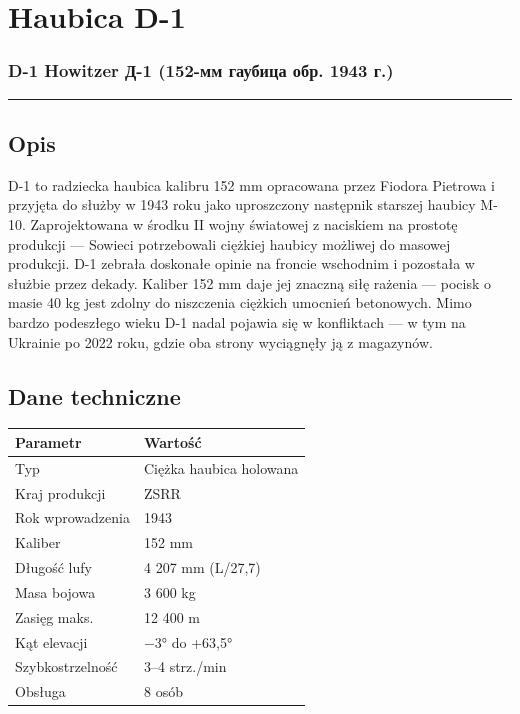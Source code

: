 \documentclass[12pt,openany,oneside]{book}
\begin{document}
\chapter{Haubica D-1}\label{haubica-d-1}

\subsection{D-1 Howitzer \textbar{} Д-1 (152-мм гаубица обр. 1943
г.)}\label{d-1-howitzer-ux434-1-152-ux43cux43c-ux433ux430ux443ux431ux438ux446ux430-ux43eux431ux440.-1943-ux433.}

\begin{center}\rule{0.5\linewidth}{0.5pt}\end{center}

\section{Opis}\label{opis-19}

D-1 to radziecka haubica kalibru 152 mm opracowana przez Fiodora
Pietrowa i przyjęta do służby w 1943 roku jako uproszczony następnik
starszej haubicy M-10. Zaprojektowana w środku II wojny światowej z
naciskiem na prostotę produkcji --- Sowieci potrzebowali ciężkiej
haubicy możliwej do masowej produkcji. D-1 zebrała doskonałe opinie na
froncie wschodnim i pozostała w służbie przez dekady. Kaliber 152 mm
daje jej znaczną siłę rażenia --- pocisk o masie 40 kg jest zdolny do
niszczenia ciężkich umocnień betonowych. Mimo bardzo podeszłego wieku
D-1 nadal pojawia się w konfliktach --- w tym na Ukrainie po 2022 roku,
gdzie oba strony wyciągnęły ją z magazynów.

\section{Dane techniczne}\label{dane-techniczne-19}

\begin{longtable}[]{@{}ll@{}}
\toprule\noalign{}
Parametr & Wartość \\
\midrule\noalign{}
\endhead
\bottomrule\noalign{}
\endlastfoot
Typ & Ciężka haubica holowana \\
Kraj produkcji & ZSRR \\
Rok wprowadzenia & 1943 \\
Kaliber & 152 mm \\
Długość lufy & 4 207 mm (L/27,7) \\
Masa bojowa & 3 600 kg \\
Zasięg maks. & 12 400 m \\
Kąt elevacji & −3° do +63,5° \\
Szybkostrzelność & 3--4 strz./min \\
Obsługa & 8 osób \\
\end{longtable}
\end{document}
